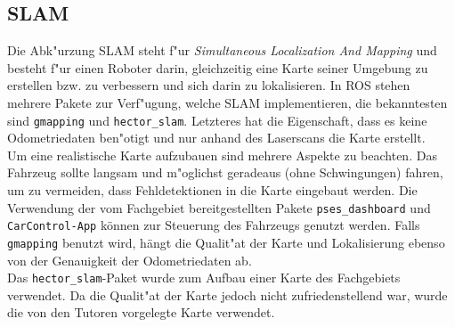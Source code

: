 \subsection{SLAM}
\label{subsec:02slam}

Die Abk"urzung SLAM steht f"ur \emph{Simultaneous Localization And Mapping} und besteht f"ur einen Roboter darin, gleichzeitig eine Karte seiner Umgebung zu erstellen bzw. zu verbessern und sich darin zu lokalisieren. In ROS stehen mehrere Pakete zur Verf"ugung, welche SLAM implementieren, die bekanntesten sind \texttt{gmapping} und \texttt{hector\_slam}. Letzteres hat die Eigenschaft, dass es keine Odometriedaten ben"otigt und nur anhand des Laserscans die Karte erstellt.\\
Um eine realistische Karte aufzubauen sind mehrere Aspekte zu beachten. Das Fahrzeug sollte langsam und m"oglichst geradeaus (ohne Schwingungen) fahren, um zu vermeiden, dass Fehldetektionen in die Karte eingebaut werden. Die Verwendung der vom Fachgebiet bereitgestellten Pakete \texttt{pses\_dashboard} und \texttt{CarControl-App} k\"onnen zur Steuerung des Fahrzeugs genutzt werden. Falls \texttt{gmapping} benutzt wird, h\"angt die Qualit"at der Karte und Lokalisierung ebenso von der Genauigkeit der Odometriedaten ab.\\
Das \texttt{hector\_slam}-Paket wurde zum Aufbau einer Karte des Fachgebiets verwendet. Da die Qualit"at der Karte jedoch nicht zufriedenstellend war, wurde die von den Tutoren vorgelegte Karte verwendet.